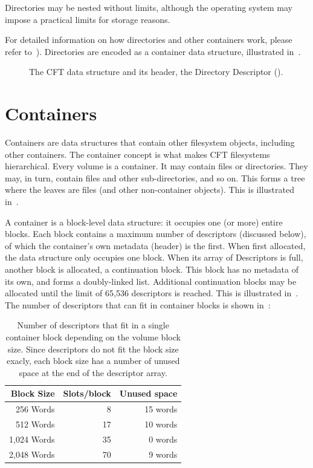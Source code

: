 Directories may be nested without limits, although the operating system may
impose a practical limits for storage reasons.

For detailed information on how directories and other containers work, please
refer to~). Directories are encoded as a 
container data structure, illustrated in~.


\begin{figure}
 \centering
 
 \caption[CFT Directory data structure]{\label{fig:fs-directory} The
   CFT  data structure and its header, the Directory
   Descriptor ().}
\end{figure}





\section{Containers}
\label{sec:fs-containers}

Containers are data structures that contain other filesystem objects, including
other containers. The container concept is what makes CFT filesystems
hierarchical. Every \gls{volume} is a container. It may contain files or
directories. They may, in turn, contain files and other sub-directories, and so
on. This forms a tree where the leaves are files (and other non-container
objects). This is illustrated in~.

A container is a block-level data structure: it occupies one (or more) entire
blocks. Each block contains a maximum number of \glspl{descriptor} (discussed
below), of which the container's own metadata (header) is the first. When first
allocated, the data structure only occupies one block. When its array of
Descriptors is full, another block is allocated, a continuation block. This
block has no metadata of its own, and forms a doubly-linked list. Additional
continuation blocks may be allocated until the limit of 65,536 descriptors is
reached. This is illustrated in~. The number of
descriptors that can fit in container blocks is shown
in~:

\begin{table}[htb]
  \centering
  \zebra
  \begin{tabular}{rrr}
    Block Size & Slots/block & Unused space \\
    \hline
    256 Words   &  8 & 15 words\\
    512 Words   & 17 & 10 words\\
    1,024 Words & 35 &  0 words\\
    2,048 Words & 70 &  9 words\\
    \hline
  \end{tabular}
  \caption[Number of Descriptors by Block Size]{\label{table:fs-desc-bs} Number
    of descriptors that fit in a single container block depending on the volume
    block size. Since descriptors do not fit the block size exacly, each block
    size has a number of unused space at the end of the descriptor array.}
\end{table}


